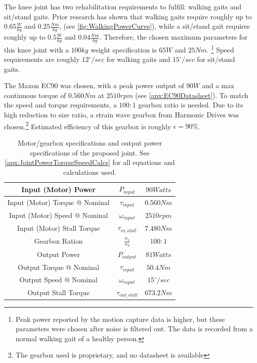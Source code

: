 The knee joint has two rehabilitation requirements to fulfill: walking gaits and sit/stand gaits. Prior research has shown that walking gaits require roughly up to \(0.65 \frac{W}{kg}\) and \(0.25\frac{Nm}{kg}\), (see \autoref{fig:WalkingPowerCurve}), while a sit/stand gait requires roughly up to \(0.5 \frac{W}{kg}\) and \(0.04 \frac{Nm}{kg}\). Therefore, the chosen maximum parameters for this knee joint with a \(100 kg\) weight specification is \(65 W\) and \(25 Nm\). \footnote{Peak power reported by the motion capture data is higher, but these parameters were chosen after noise is filtered out. The data is recorded from a normal walking gait of a healthy person.} Speed requirements are roughly \(12^\circ/sec\) for walking gaits and \(15^\circ/sec\) for sit/stand gaits.

The Maxon EC90 was chosen, with a peak power output of \(90W\) and a max continuous torque of \(0.560 Nm\) at \(2510 rpm\) (see \autoref{apx:EC90Datasheet}). To match the speed and torque requirements, a \(100:1\) gearbox ratio is needed. Due to its high reduction to size ratio, a strain wave gearbox from {Harmonic Drives\texttrademark} was chosen.\footnote{The gearbox used is proprietary, and no datasheet is available} Estimated efficiency of this gearbox is roughly \(\epsilon = 90\%\).

\begin{table}
    \centering
    \begin{tabular}{||c|c|c||}
        \hline
        Input (Motor) Power & \(P_{input}\) & \(90 Watts\) \\
        \hline
        Input (Motor) Torque @ Nominal & \(\tau_{input}\) & \(0.560 Nm\) \\
        \hline
        Input (Motor) Speed @ Nominal & \(\omega_{input}\) & \(2510 rpm\) \\
        \hline
        Input (Motor) Stall Torque & \(\tau_{in\_stall}\) & \(7.480 Nm\) \\
        \hline \hline
        Gearbox Ration & \(\frac{n_1}{n_2}\) & \(100:1\) \\
        \hline \hline
        Output Power & \(P_{output}\) & \(81 Watts\) \\
        \hline
        Output Torque @ Nominal & \(\tau_{input}\) & \(50.4 Nm\) \\
        \hline
        Output Speed @ Nominal & \(\omega_{input}\) & \(15^\circ/sec\) \\
        \hline
        Output Stall Torque & \(\tau_{out\_stall}\) & \(673.2 Nm\) \\
        \hline
    \end{tabular}
    \caption{Motor/gearbox specifications and output power specifications of the proposed joint. See \autoref{apx:JointPowerTorqueSpeedCalcs} for all equations and calculations used.}
    \label{table:MotorGearboxSpecs}
\end{table}

